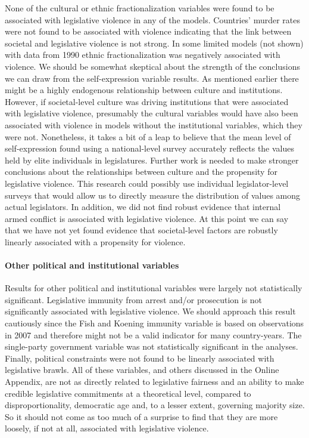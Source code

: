 \documentclass[a4paper]{article}\usepackage[]{graphicx}\usepackage[]{color}
\begin{document}
None of the cultural or ethnic fractionalization variables were found to be associated with legislative violence in any of the models. Countries' murder rates were not found to be associated with violence indicating that the link between societal and legislative violence is not strong. In some limited models (not shown) with data from 1990 ethnic fractionalization was negatively associated with violence. We should be somewhat skeptical about the strength of the conclusions we can draw from the self-expression variable results. As mentioned earlier there might be a highly endogenous relationship between culture and institutions. However, if societal-level culture was driving institutions that were associated with legislative violence, presumably the cultural variables would have also been associated with violence in models without the institutional variables, which they were not. Nonetheless, it takes a bit of a leap to believe that the mean level of self-expression found using a national-level survey accurately reflects the values held by elite individuals in legislatures. Further work is needed to make stronger conclusions about the relationships between culture and the propensity for legislative violence. This research could possibly use individual legislator-level surveys that would allow us to directly measure the distribution of values among actual legislators. In addition, we did not find robust evidence that internal armed conflict is associated with legislative violence. At this point we can say that we have not yet found evidence that societal-level factors are robustly linearly associated with a propensity for violence.

\paragraph{Other political and institutional variables}

Results for other political and institutional variables were largely not statistically significant. Legislative immunity from arrest and/or prosecution is not significantly associated with legislative violence. We should approach this result cautiously since the Fish and Koening immunity variable is based on observations in 2007 and therefore might not be a valid indicator for many country-years. The single-party government variable was not statistically significant in the analyses. Finally, political constraints were not found to be linearly associated with legislative brawls. All of these variables, and others discussed in the Online Appendix, are not as directly related to legislative fairness and an ability to make credible legislative commitments at a theoretical level, compared to disproportionality, democratic age and, to a lesser extent, governing majority size. So it should not come as too much of a surprise to find that they are more loosely, if not at all, associated with legislative violence.
\end{document}

